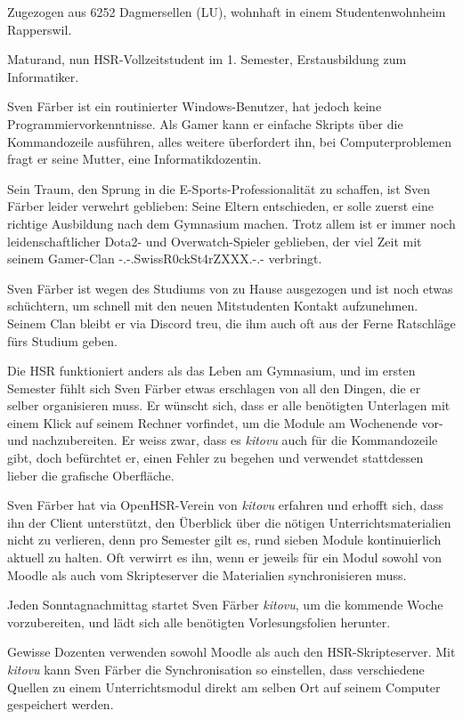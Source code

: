\documentclass[a4paper]{article}
\begin{document}
\begin{description}[uclist]
	\item[Adresse] Zugezogen aus 6252 Dagmersellen (LU), wohnhaft in einem Studentenwohnheim Rapperswil.
	\item[Ausbildung und Beruf] Maturand, nun HSR-Vollzeitstudent im 1. Semester, Erstausbildung zum Informatiker.
	\item[Informatikkenntnisse] Sven Färber ist ein routinierter Windows-Benutzer, hat jedoch keine Programmiervorkenntnisse. Als Gamer kann er einfache Skripts über die Kommandozeile ausführen, alles weitere überfordert ihn, bei Computerproblemen fragt er seine Mutter, eine Informatikdozentin.
	\item[Freizeitbeschäftigung] Sein Traum, den Sprung in die E-Sports-Professionalität zu schaffen, ist Sven Färber leider verwehrt geblieben: Seine Eltern entschieden, er solle zuerst eine richtige Ausbildung nach dem Gymnasium machen. Trotz allem ist er immer noch leidenschaftlicher Dota2- und Overwatch-Spieler geblieben, der viel Zeit mit seinem Gamer-Clan -.-.SwissR0ckSt4rZXXX.-.- verbringt.
	\item[Persönlichkeit] Sven Färber ist wegen des Studiums von zu Hause ausgezogen und ist noch etwas schüchtern, um schnell mit den neuen Mitstudenten Kontakt aufzunehmen. Seinem Clan bleibt er via Discord treu, die ihm auch oft aus der Ferne Ratschläge fürs Studium geben. 
	\item[Einschränkungen, Ziele und Wünsche] Die HSR funktioniert anders als das Leben am Gymnasium, und im ersten Semester fühlt sich Sven Färber etwas erschlagen von all den Dingen, die er selber organisieren muss. Er wünscht sich, dass er alle benötigten Unterlagen mit einem Klick auf seinem Rechner vorfindet, um die Module am Wochenende vor- und nachzubereiten. Er weiss zwar, dass es \emph{kitovu} auch für die Kommandozeile gibt, doch befürchtet er, einen Fehler zu begehen und verwendet stattdessen lieber die grafische Oberfläche.
	\item[Erwartungen an \emph{kitovu}] Sven Färber hat via OpenHSR-Verein von \emph{kitovu} erfahren und erhofft sich, dass ihn der Client unterstützt, den Überblick über die nötigen Unterrichtsmaterialien nicht zu verlieren, denn pro Semester gilt es, rund sieben Module kontinuierlich aktuell zu halten. Oft verwirrt es ihn, wenn er jeweils für ein Modul sowohl von Moodle als auch vom Skripteserver die Materialien synchronisieren muss.
	\item[Szenario: ``Beschäftigter Vollzeitstudent''] Jeden Sonntagnachmittag startet Sven Färber \emph{kitovu}, um die kommende Woche vorzubereiten, und lädt sich alle benötigten Vorlesungsfolien herunter.
	\item[Szenario: ``Viele Plattformen''] Gewisse Dozenten verwenden sowohl Moodle als auch den HSR-Skripteserver. Mit \emph{kitovu} kann Sven Färber die Synchronisation so einstellen, dass verschiedene Quellen zu einem Unterrichtsmodul direkt am selben Ort auf seinem Computer gespeichert werden.
\end{description}
\end{document}
